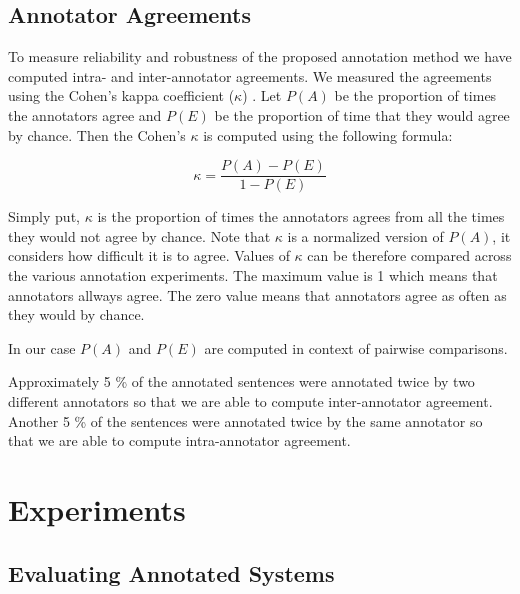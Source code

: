 \subsection{Annotator Agreements}

To measure reliability and robustness of the proposed annotation method we have
computed intra- and inter-annotator agreements.  We measured the agreements
using the Cohen's kappa coefficient ($\kappa$) . Let $P(A)$
be the proportion of times the annotators agree and $P(E)$ be the proportion of
time that they would agree by chance. Then the Cohen's $\kappa$ is computed
using the following formula:

\begin{equation*}
    \kappa = \frac{P(A)-P(E)}{1-P(E)}
\end{equation*}

\noindent Simply put, $\kappa$ is the proportion of times the annotators agrees
from all the times they would not agree by chance. Note that $\kappa$ is a
normalized version of $P(A)$, it considers how difficult it is to agree.
Values of $\kappa$ can be therefore compared across the various annotation
experiments. The maximum value is 1 which means that annotators allways agree.
The zero value means that annotators agree as often as they would by chance.

In our case $P(A)$ and $P(E)$ are computed in context of pairwise comparisons.






Approximately 5 \% of the
annotated sentences were annotated twice by two different annotators so that we
are able to compute inter-annotator agreement.  Another 5 \% of the sentences
were annotated twice by the same annotator so that we are able to compute
intra-annotator agreement.




\section{Experiments}

\subsection{Evaluating Annotated Systems}

